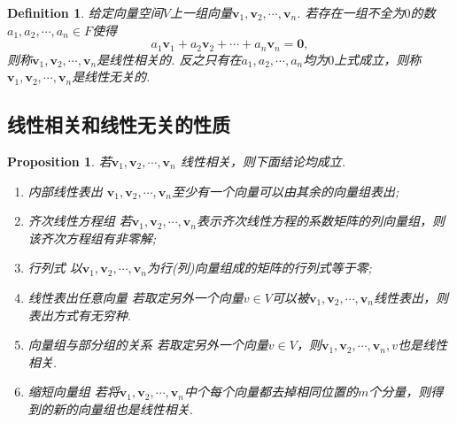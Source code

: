 \documentclass{article}
\newtheorem{proposition}[theorem]{Proposition}
\newtheorem{definition}[theorem]{Definition}
\newcommand{\mbf}[1]{\bm{#1}}
\begin{document}
\begin{definition}
\rm 给定向量空间$V$上一组向量$\mbf{v}_1,\mbf{v}_2,\cdots,\mbf{v}_n$. 若存在一组不全为$0$的数$a_1, a_2, \cdots, a_n \in F$使得
$$
a_1\mbf{v}_1 + a_2\mbf{v}_2 + \cdots + a_n\mbf{v}_n = \mbf{0},
$$
则称$\mbf{v}_1,\mbf{v}_2,\cdots,\mbf{v}_n$是线性相关的. 反之只有在$a_1, a_2, \cdots, a_n$均为$0$上式成立，则称$\mbf{v}_1,\mbf{v}_2,\cdots,\mbf{v}_n$是线性无关的.
\end{definition}

\newpage
\subsection{线性相关和线性无关的性质}

\begin{proposition}
\rm 若$\mbf{v}_1,\mbf{v}_2,\cdots,\mbf{v}_n$ {\color{red}线性相关}，则下面结论均成立.
\begin{enumerate}
	\item {\color{red} 内部线性表出} $\mbf{v}_1,\mbf{v}_2,\cdots,\mbf{v}_n$至少有一个向量可以由其余的向量组表出;
	\item {\color{red} 齐次线性方程组} 若$\mbf{v}_1,\mbf{v}_2,\cdots,\mbf{v}_n$表示齐次线性方程的系数矩阵的列向量组，则该齐次方程组有非零解;
	\item {\color{red} 行列式} 以$\mbf{v}_1,\mbf{v}_2,\cdots,\mbf{v}_n$为行(列)向量组成的矩阵的行列式等于零;
	\item {\color{red} 线性表出任意向量} 若取定另外一个向量$v \in V$可以被$\mbf{v}_1,\mbf{v}_2,\cdots,\mbf{v}_n$线性表出，则表出方式有无穷种.
	\item {\color{red} 向量组与部分组的关系} 若取定另外一个向量$v \in V$，则$\mbf{v}_1,\mbf{v}_2,\cdots,\mbf{v}_n, v$也是线性相关.
	\item {\color{red} 缩短向量组} 若将$\mbf{v}_1,\mbf{v}_2,\cdots,\mbf{v}_n$中个每个向量都去掉相同位置的$m$个分量，则得到的新的向量组也是线性相关.
\end{enumerate}
\end{proposition}
\end{document}

